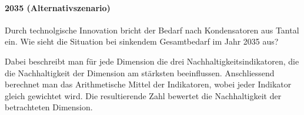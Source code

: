 \paragraph{2035 (Alternativszenario)}
Durch technolgische Innovation bricht der Bedarf nach Kondensatoren aus Tantal ein. Wie sieht die Situation bei sinkendem Gesamtbedarf im Jahr 2035 aus?

Dabei beschreibt man für jede Dimension die drei Nachhaltigkeitsindikatoren, die die Nachhaltigkeit der Dimension am stärksten beeinflussen. Anschliessend berechnet man das Arithmetische Mittel der Indikatoren, wobei jeder Indikator gleich gewichtet wird.
Die resultierende Zahl bewertet die Nachhaltigkeit der betrachteten Dimension.
